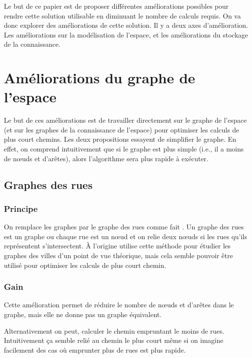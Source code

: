 \documentclass[a4paper]{article}
\begin{document}
Le but de ce papier est de proposer différentes améliorations possibles pour
rendre cette solution utilisable en diminuant le nombre de calculs requis. On
va donc explorer des améliorations de cette solution. Il y a deux axes
d'amélioration. Les améliorations sur la modélisation de l'espace, et les
améliorations du stockage de la connaissance.

\section{Améliorations du graphe de l'espace}

Le but de ces améliorations est de travailler directement sur le graphe de
l'espace (et sur les graphes de la connaissance de l'espace) pour optimiser les
calculs de plus court chemins. Les deux propositions essayent de simplifier le
graphe. En effet, on comprend intuitivement que si le graphe est plus simple
(i.e., il a moins de nœuds et d'arêtes), alors l'algorithme sera plus rapide à
exécuter.

  \subsection{Graphes des rues}

    \subsubsection{Principe}

On remplace les graphes par le graphe des rues comme fait
\cite{porta2005}. Un graphe des rues est un graphe ou chaque rue est un nœud et
on relie deux nœuds si les rues qu'ils représentent s'intersectent. À l'origine
\cite{porta2005} utilise cette méthode pour étudier les graphes des villes d'un
point de vue théorique, mais cela semble pouvoir être utilisé pour optimiser les
calculs de plus court chemin.

    \subsubsection{Gain}

Cette amélioration permet de réduire le nombre de nœuds et d'arêtes dans le
graphe, mais elle ne donne pas un graphe équivalent.

Alternativement on peut, calculer le chemin empruntant le moins de rues.
Intuitivement ça semble relié au chemin le plus court même si on imagine
facilement des cas où emprunter plus de rues est plus rapide.
\end{document}
